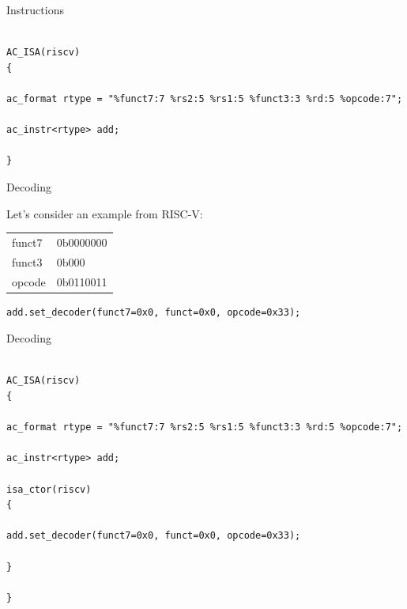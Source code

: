 \begin{frame}[fragile]{Instructions}

\begin{lstlisting}

AC_ISA(riscv)
{

ac_format rtype = "%funct7:7 %rs2:5 %rs1:5 %funct3:3 %rd:5 %opcode:7";

ac_instr<rtype> add;

}

\end{lstlisting}
\end{frame}

\begin{frame}[fragile]{Decoding}

Let's consider an example from RISC-V:

\pause


\bigskip
\pause


\pause
\bigskip

\ttfamily\scriptsize{
\begin{tabular}{l l}
funct7 & 0b0000000 \\
funct3 & 0b000 \\
opcode & 0b0110011 \\
\end{tabular}
}

\pause

\begin{lstlisting}
add.set_decoder(funct7=0x0, funct=0x0, opcode=0x33);
\end{lstlisting}

\end{frame}

\begin{frame}[fragile]{Decoding}

\begin{lstlisting}

AC_ISA(riscv)
{

ac_format rtype = "%funct7:7 %rs2:5 %rs1:5 %funct3:3 %rd:5 %opcode:7";

ac_instr<rtype> add;

isa_ctor(riscv)
{

add.set_decoder(funct7=0x0, funct=0x0, opcode=0x33);

}

}

\end{lstlisting}
\end{frame}


